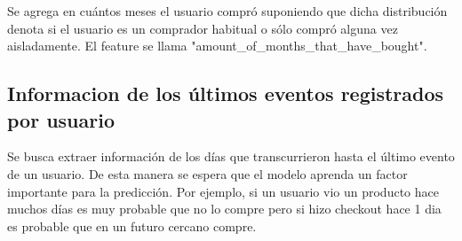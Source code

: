 \documentclass[a4paper]{article}
\begin{document}
Se agrega en cuántos meses el usuario compró suponiendo que dicha distribución denota si el usuario es un comprador habitual o sólo compró alguna vez aisladamente. El feature se llama "amount\_of\_months\_that\_have\_bought".

\subsection{Informacion de los últimos eventos registrados por usuario}

Se busca extraer información de los días que transcurrieron hasta el último evento de un usuario. De esta manera se espera que el modelo aprenda un factor importante para la predicción. Por ejemplo, si un usuario vio un producto hace muchos días es muy probable que no lo compre pero si hizo checkout hace 1 dia es probable que en un futuro cercano compre.
\end{document}

